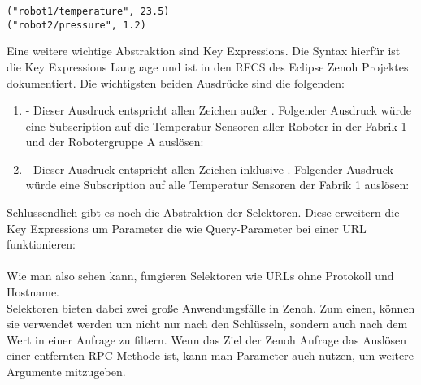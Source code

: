 \begin{lstlisting}
("robot1/temperature", 23.5)
("robot2/pressure", 1.2)
\end{lstlisting}

Eine weitere wichtige Abstraktion sind Key Expressions. Die Syntax hierfür ist die Key Expressions Language\cite{Eclipsezenoh} und ist in den RFCS des Eclipse Zenoh Projektes dokumentiert. Die wichtigsten beiden Ausdrücke sind die folgenden:

\begin{enumerate}
  \item \code{*} - Dieser Ausdruck entspricht allen Zeichen außer \code{/}. Folgender Ausdruck würde eine Subscription auf die Temperatur Sensoren aller Roboter in der Fabrik 1 und der Robotergruppe A auslösen:\\
  \item \code{**} - Dieser Ausdruck entspricht allen Zeichen inklusive \code{/}. Folgender Ausdruck würde eine Subscription auf alle Temperatur Sensoren der Fabrik 1 auslösen:\\
\end{enumerate}

Schlussendlich gibt es noch die Abstraktion der Selektoren. Diese erweitern die Key Expressions um Parameter die wie Query-Parameter bei einer URL funktionieren:\\
\\
Wie man also sehen kann, fungieren Selektoren wie URLs ohne Protokoll und Hostname.\\
Selektoren bieten dabei zwei große Anwendungsfälle in Zenoh. Zum einen, können sie verwendet werden um nicht nur nach den Schlüsseln, sondern auch nach dem Wert in einer Anfrage zu filtern. Wenn das Ziel der Zenoh Anfrage das Auslösen einer entfernten RPC-Methode ist, kann man Parameter auch nutzen, um weitere Argumente mitzugeben.



